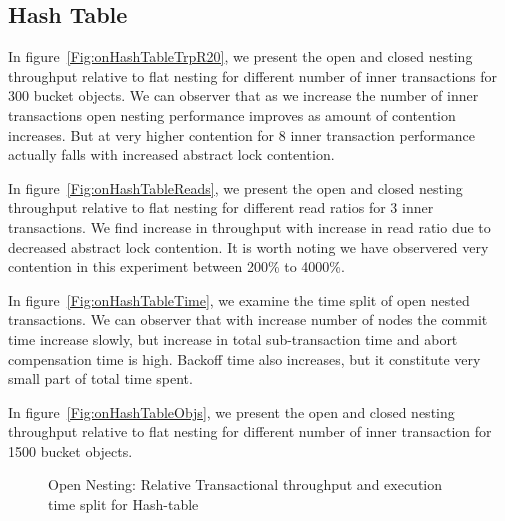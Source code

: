 \documentclass[12pt,english]{report}
\begin{document}
\subsection{Hash Table}

In figure~\ref{Fig:onHashTableTrpR20}, we present the open and closed nesting throughput relative to flat nesting for different number of inner transactions for 300 bucket objects. We can observer that as we increase the number of inner transactions open nesting performance improves as amount of contention increases. But at very higher contention for 8 inner transaction performance actually falls with increased abstract lock contention. 

In figure~\ref{Fig:onHashTableReads}, we present the open and closed nesting throughput relative to flat nesting for different read ratios for 3 inner transactions. We find increase in throughput with increase in read ratio due to decreased abstract lock contention. It is worth noting we have observered very contention in this experiment between 200\% to 4000\%. 

In figure~\ref{Fig:onHashTableTime}, we examine the time split of open nested transactions. We can observer 
that with increase number of nodes the commit time increase slowly, but increase in total sub-transaction time and abort compensation time is high. Backoff time also increases, but it constitute very small part of total time spent.  

In figure~\ref{Fig:onHashTableObjs}, we present the open and closed nesting throughput relative to flat nesting for different number of inner transaction for 1500 bucket objects.

\begin{figure}[H]
\centering
{}
\end{figure}
\begin{figure}[H]
\centering
{}
\end{figure}
\begin{figure}[H]
\centering
{}
\end{figure}
\begin{figure}[H]
\centering
{}
\caption{Open Nesting: Relative Transactional throughput and execution time split for Hash-table}
\label{Fig:cpHashTable}
\end{figure}
\end{document}
